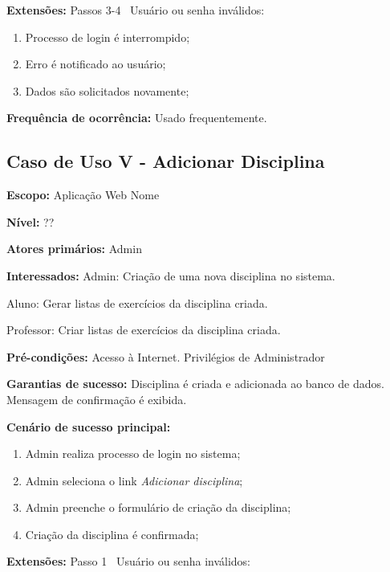 \documentclass[12pt,oneside,a4paper,article]{abntex2}
\begin{document}
		\textbf{Extensões:} Passos 3-4 \textrightarrow \ Usuário ou senha inválidos:
		
		\begin{enumerate}[label=\alph*.]	
			\item Processo de login é interrompido;
			\item Erro é notificado ao usuário;
			\item Dados são solicitados novamente;
		\end{enumerate}
		
		\textbf{Frequência de ocorrência:} Usado frequentemente.
		
		\subsection{Caso de Uso V - Adicionar Disciplina}
		
		\textbf{Escopo:} Aplicação Web Nome
		
		\textbf{Nível:} ??
		
		\textbf{Atores primários:} Admin
		
		\textbf{Interessados:} Admin: Criação de uma nova disciplina no sistema.
		
		Aluno: Gerar listas de exercícios da disciplina criada.
		
		Professor: Criar listas de exercícios da disciplina criada.
		
		\textbf{Pré-condições:} Acesso à Internet. Privilégios de Administrador
		
		\textbf{Garantias de sucesso:} Disciplina é criada e adicionada ao banco de dados. Mensagem de confirmação é exibida.
		
		\textbf{Cenário de sucesso principal:}
		
		\begin{enumerate}
			\item Admin realiza processo de login no sistema;
			
			\item Admin seleciona o link \textit{Adicionar disciplina};
			
			\item Admin preenche o formulário de criação da disciplina;
			
			\item Criação da disciplina é confirmada;
			
			
		\end{enumerate}
		
		\textbf{Extensões:} Passo 1 \textrightarrow \ Usuário ou senha inválidos:
		
\end{document}
